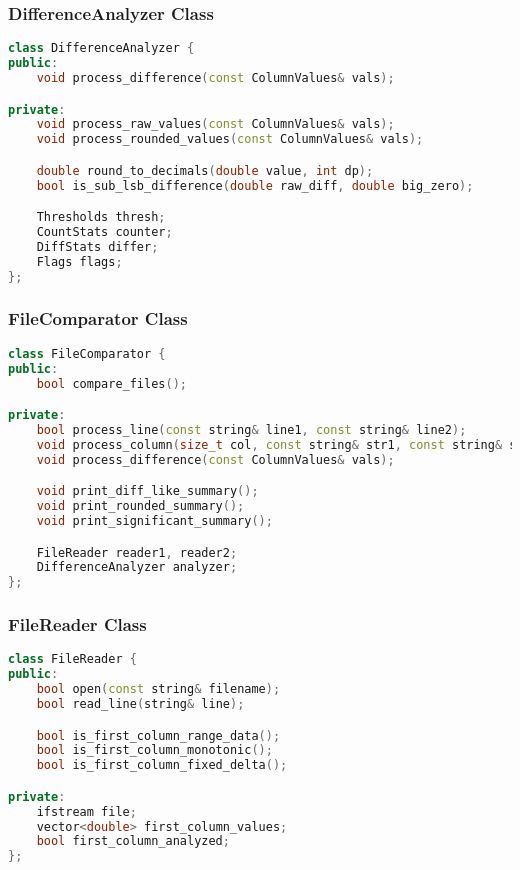 \subsubsection{DifferenceAnalyzer Class}

\begin{lstlisting}[language=C++]
class DifferenceAnalyzer {
public:
    void process_difference(const ColumnValues& vals);

private:
    void process_raw_values(const ColumnValues& vals);
    void process_rounded_values(const ColumnValues& vals);

    double round_to_decimals(double value, int dp);
    bool is_sub_lsb_difference(double raw_diff, double big_zero);

    Thresholds thresh;
    CountStats counter;
    DiffStats differ;
    Flags flags;
};
\end{lstlisting}

\subsubsection{FileComparator Class}

\begin{lstlisting}[language=C++]
class FileComparator {
public:
    bool compare_files();

private:
    bool process_line(const string& line1, const string& line2);
    void process_column(size_t col, const string& str1, const string& str2);
    void process_difference(const ColumnValues& vals);

    void print_diff_like_summary();
    void print_rounded_summary();
    void print_significant_summary();

    FileReader reader1, reader2;
    DifferenceAnalyzer analyzer;
};
\end{lstlisting}

\subsubsection{FileReader Class}

\begin{lstlisting}[language=C++]
class FileReader {
public:
    bool open(const string& filename);
    bool read_line(string& line);

    bool is_first_column_range_data();
    bool is_first_column_monotonic();
    bool is_first_column_fixed_delta();

private:
    ifstream file;
    vector<double> first_column_values;
    bool first_column_analyzed;
};
\end{lstlisting}

